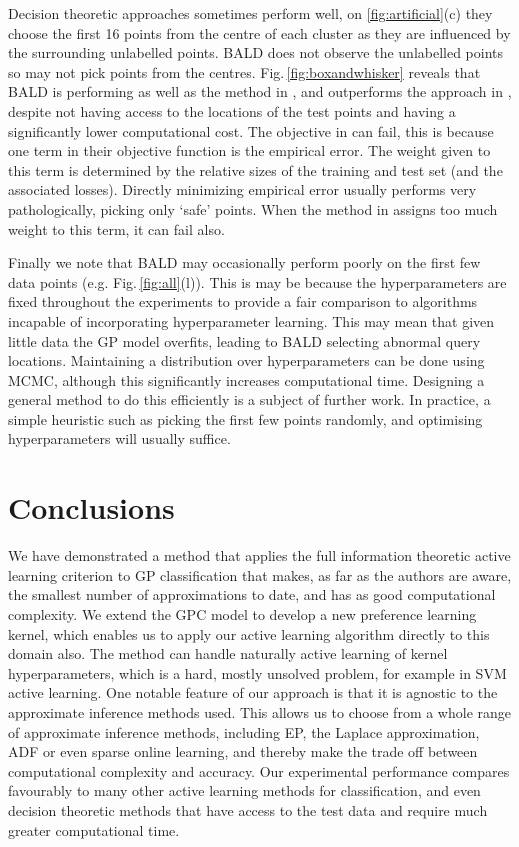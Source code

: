 \documentclass[twoside]{article}
\newcommand{\ourmethod}{BALD } %
\begin{document}
Decision theoretic approaches sometimes perform well, on \ref{fig:artificial}(c) they choose the first 16 points from the centre of each cluster as they are influenced by the surrounding unlabelled points. \ourmethod does not observe the unlabelled points so may not pick points from the centres. Fig.\,\ref{fig:boxandwhisker} reveals that BALD is performing as well as the method in \cite{zhu2003}, and outperforms the approach in \cite{kapoor2007}, despite not having access to the locations of the test points and having a significantly lower computational cost. The objective in \cite{kapoor2007} can fail, this is because one term in their objective function is the empirical error. The weight given to this term is determined by the relative sizes of the training and test set (and the associated losses). Directly minimizing empirical error usually performs very pathologically, picking only `safe' points. When the method in \cite{kapoor2007} assigns too much weight to this term, it can fail also.

Finally we note that BALD may occasionally perform poorly on the first few data points (e.g. Fig.\,\ref{fig:all}(l)). This is may be because the hyperparameters are fixed throughout the experiments to provide a fair comparison to algorithms incapable of incorporating hyperparameter learning. This may mean that given little data the GP model overfits, leading to BALD selecting abnormal query locations. Maintaining a distribution over hyperparameters can be done using MCMC, although this significantly increases computational time. Designing a general method to do this efficiently is a subject of further work. In practice, a simple heuristic such as picking the first few points randomly, and optimising hyperparameters will usually suffice.  

 
\section{Conclusions}

We have demonstrated a method that applies the full information theoretic active learning criterion to GP classification that makes, as far as the authors are aware, the smallest number of approximations to date, and has as good computational complexity. We extend the GPC model to develop a new preference learning kernel, which enables us to apply our active learning algorithm directly to this domain also. The method can handle naturally active learning of kernel hyperparameters, which is a hard, mostly unsolved problem, for example in SVM active learning. One notable feature of our approach is that it is agnostic to the approximate inference methods used. This allows us to choose from a whole range of approximate inference methods, including EP, the Laplace approximation, ADF or even sparse online learning, and thereby make the trade off between computational complexity and accuracy. Our experimental performance compares favourably to many other active learning methods for classification, and even decision theoretic methods that have access to the test data and require much greater computational time.
\end{document}
